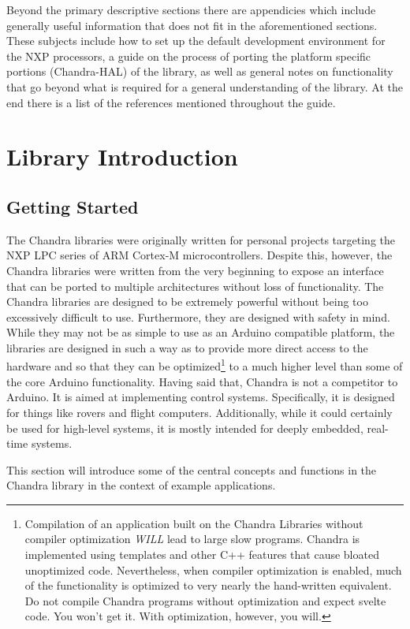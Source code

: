 \documentclass[10pt,letterpaper]{memoir} %
\begin{document}
Beyond the primary descriptive sections there are appendicies which include generally useful information that does not fit in the aforementioned sections.  These subjects include how to set up the default development environment for the NXP processors, a guide on the process of porting the platform specific portions (Chandra-HAL) of the library, as well as general notes on functionality that go beyond what is required for a general understanding of the library.  At the end there is a list of the references mentioned throughout the guide.

\part{Library Introduction}
\chapter{Getting Started}
The Chandra libraries were originally written for personal projects targeting the NXP LPC series of ARM Cortex-M microcontrollers.  Despite this, however, the Chandra libraries were written from the very beginning to expose an interface that can be ported to multiple architectures without loss of functionality.  The Chandra libraries are designed to be extremely powerful without being too excessively difficult to use.  Furthermore, they are designed with safety in mind.  While they may not be as simple to use as an Arduino compatible platform, the libraries are designed in such a way as to provide more direct access to the hardware and so that they can be optimized\footnote{Compilation of an application built on the Chandra Libraries without compiler optimization \emph{WILL} lead to large slow programs.  Chandra is implemented using templates and other C++ features that cause bloated unoptimized code.  Nevertheless, when compiler optimization is enabled, much of the functionality is optimized to very nearly the hand-written equivalent.  Do not compile Chandra programs without optimization and expect svelte code.  You won't get it.  With optimization, however, you will.} to a much higher level than some of the core Arduino functionality.  Having said that, Chandra is not a competitor to Arduino.  It is aimed at implementing control systems.  Specifically, it is designed for things like rovers and flight computers.  Additionally, while it could certainly be used for high-level systems, it is mostly intended for deeply embedded, real-time systems.

This section will introduce some of the central concepts and functions in the Chandra library in the context of example applications.  
\end{document}
